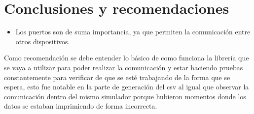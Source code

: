 \section{Conclusiones y recomendaciones}
\begin{itemize}
    \item Los puertos son de suma importancia, ya que permiten la comunicación entre otros dispositivos.
\end{itemize}
Como recomendación se debe entender lo básico de como funciona la librería que se vaya a utilizar para poder realizar la comunicación y estar haciendo pruebas constantemente para verificar de que se esté trabajando de la forma que se espera, esto fue notable en la parte de generación del csv al igual que observar la comunicación dentro del mismo simulador porque hubieron momentos donde los datos se estaban imprimiendo de forma incorrecta.